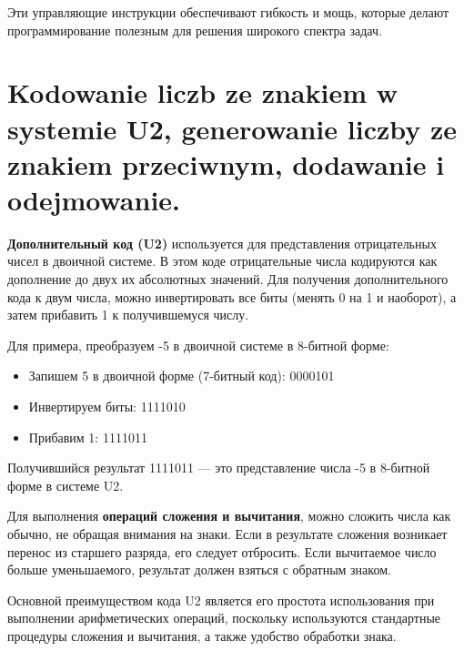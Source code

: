 Эти управляющие инструкции обеспечивают гибкость и мощь, которые делают программирование полезным для решения широкого спектра задач.

\section{Kodowanie liczb ze znakiem w systemie U2, generowanie liczby ze znakiem przeciwnym, dodawanie i odejmowanie.}

\textbf{Дополнительный код (U2)} используется для представления отрицательных чисел в двоичной системе. В этом коде отрицательные числа кодируются как дополнение до двух их абсолютных значений. Для получения дополнительного кода к двум числа, можно инвертировать все биты (менять 0 на 1 и наоборот), а затем прибавить 1 к получившемуся числу.

Для примера, преобразуем -5 в двоичной системе в 8-битной форме:

\begin{itemize}
\item Запишем 5 в двоичной форме (7-битный код): 0000101
\item Инвертируем биты: 1111010
\item Прибавим 1: 1111011
\end{itemize}

Получившийся результат 1111011 — это представление числа -5 в 8-битной форме в системе U2.

Для выполнения \textbf{операций сложения и вычитания}, можно сложить числа как обычно, не обращая внимания на знаки. Если в результате сложения возникает перенос из старшего разряда, его следует отбросить. Если вычитаемое число больше уменьшаемого, результат должен взяться с обратным знаком.

Основной преимуществом кода U2 является его простота использования при выполнении арифметических операций, поскольку используются стандартные процедуры сложения и вычитания, а также удобство обработки знака.

